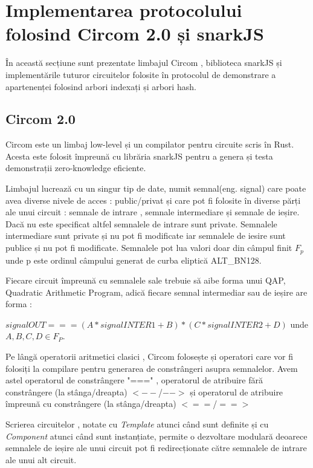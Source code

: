 \documentclass[12pt, letterpaper]{article}
\begin{document}
\section{Implementarea protocolului folosind Circom 2.0 și snarkJS}

În această secțiune sunt prezentate limbajul Circom , biblioteca snarkJS și implementările tuturor circuitelor folosite în protocolul de demonstrare a apartenenței folosind arbori indexați și arbori hash.

\subsection{Circom 2.0}

Circom este un limbaj low-level și un compilator pentru circuite scris în Rust. Acesta este folosit împreună cu librăria snarkJS pentru a genera și testa demonstrații zero-knowledge eficiente.

Limbajul lucrează cu un singur tip de date, numit semnal(eng. signal) care poate avea diverse nivele de acces : public/privat și care pot fi folosite în diverse părți ale unui circuit : semnale de intrare , semnale intermediare și semnale de ieșire. Dacă nu este specificat altfel semnalele de intrare sunt private. Semnalele intermediare sunt private și nu pot fi modificate iar semnalele de iesire sunt publice și nu pot fi modificate. Semnalele pot lua valori doar din câmpul finit $F_p$ unde p este ordinul câmpului generat de curba eliptică ALT\_BN128.\cite{eip196}

Fiecare circuit împreună cu semnalele sale trebuie să aibe forma unui QAP, Quadratic Arithmetic Program, adică fiecare semnal intermediar sau de ieșire are forma : 

$signalOUT === (A*signalINTER1+B)*(C*signalINTER2+D)$
unde $A,B,C,D \in F_P$.

Pe lângă operatorii aritmetici clasici , Circom folosește și operatori care vor fi folosiți la compilare pentru generarea de constrângeri asupra semnalelor. Avem astel operatorul de constrângere "===" , operatorul de atribuire fără constrângere (la stânga/dreapta) $<--$/$-->$ și operatorul de atribuire împreună cu constrângere (la stânga/dreapta) $<==$/$==>$


Scrierea circuitelor , notate cu \emph{Template} atunci când sunt definite și cu \emph{Component} atunci când sunt instanțiate, permite o dezvoltare modulară deoarece semnalele de ieșire ale unui circuit pot fi redirecționate către semnalele de intrare ale unui alt circuit.
\end{document}
